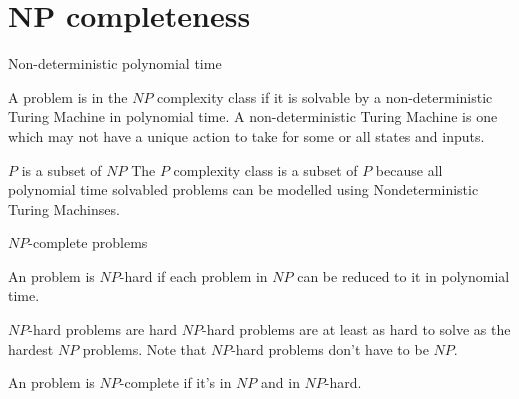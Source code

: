 


\section{NP completeness}


\begin{frame}{Non-deterministic polynomial time}
  \begin{definition}
  A problem is in the $NP$ complexity class if it is solvable by a non-deterministic Turing Machine in polynomial time. A non-deterministic Turing Machine is one which may not have a unique action to take for some or all states and inputs.
  \end{definition}
  
  \vspace{0.5cm}
  \begin{block}{$P$ is a subset of $NP$}
  The $P$ complexity class is a subset of $P$ because all polynomial time solvabled problems can be modelled using Nondeterministic Turing Machinses.
  \end{block}

\end{frame}


\begin{frame}{$NP$-complete problems}
  \begin{definition}
    An problem is $NP$-hard if each problem in $NP$ can be reduced to it in polynomial time.
  \end{definition}
  
  \vspace{0.5cm}
  {
  \begin{block}{$NP$-hard problems are hard}
  $NP$-hard problems are at least as hard to solve as the hardest $NP$ problems.
  Note that $NP$-hard problems don't have to be $NP$.
  \end{block}}
  
  \vspace{0.5cm}
  \begin{definition}
    An problem is $NP$-complete if it's in $NP$ and in $NP$-hard.
  \end{definition}
\end{frame}



